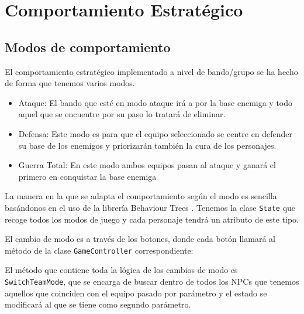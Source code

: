  \section{Comportamiento Estratégico}
 
 \subsection{Modos de comportamiento}
 
 El comportamiento estratégico implementado a nivel de bando/grupo se ha hecho de forma que tenemos varios modos.
 
 \begin{itemize}
     \item Ataque: El bando que esté en modo ataque irá a por la base enemiga y todo aquel que se encuentre por su paso lo tratará de eliminar.
     \item Defensa: Este modo es para que el equipo seleccionado se centre en defender su base de los enemigos y priorizarán también la cura de los personajes.
     \item Guerra Total: En este modo ambos equipos pasan al ataque y ganará el primero en conquistar la base enemiga
 \end{itemize}
 
La manera en la que se adapta el comportamiento según el modo es sencilla basándonos en el uso de la librería Behaviour Trees \cite{uniBT}. Tenemos la clase \texttt{State} que recoge todos los modos de juego y cada personaje tendrá un atributo de este tipo.



El cambio de modo es a través de los botones, donde cada botón llamará al método de la clase \texttt{GameController} correspondiente:











El método que contiene toda la lógica de los cambios de modo es \texttt{SwitchTeamMode}, que se encarga de buscar dentro de todos los NPCs que tenemos  aquellos que coinciden con el equipo pasado por parámetro y el estado se modificará al que se tiene como segundo parámetro.


